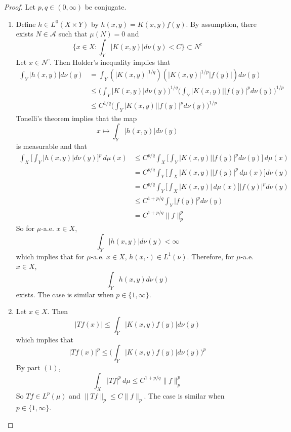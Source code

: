 \documentclass{book}
\theoremstyle{definition}
\newcommand{\MA}{\mathcal{A}}
\DeclareMathOperator*{\0}{\mbf{0}}
\DeclareMathOperator*{\1}{\mbf{1}}
\newcommand{\dmu}{\, d \mu}
\begin{document}
	\begin{proof}Let $p,q \in (0,\infty)$ be conjugate.
	\begin{enumerate}
	\item Define $h \in L^0(X \times Y)$ by $h(x,y) = K(x, y) f(y)$. By assumption, there exists $N \in \MA$ such that $\mu(N) = 0$ and  $$\bigg \{x \in X: \int_Y |K(x, y)| d \nu(y) < C \bigg\} \subset N^c$$ 
	Let $x \in N^c$. Then Holder's inequality implies that
	\begin{align*}
	\int_Y |h(x,y)| d\nu(y) 
	&= \int_Y (|K(x,y)|^{1/q})(|K(x,y)|^{1/p}|f(y)|) d\nu(y) \\
	& \leq \bigg( \int_Y |K(x,y)| d \nu(y) \bigg)^{1/q} \bigg( \int_Y |K(x,y)||f(y)|^p d\nu(y) \bigg)^{1/p} \\
	& \leq C^{1/q} \bigg( \int_Y |K(x,y)||f(y)|^p d\nu(y) \bigg)^{1/p}
	\end{align*}
	Tonelli's theorem implies that the map $$x \mapsto \int_Y |h(x,y)| d\nu(y) $$ is measurable and that  
	\begin{align*}
	\int_X \bigg[ \int_Y |h(x,y)| d\nu(y) \bigg]^p \dmu(x) 
	&\leq  C^{p/q}  \int_X \bigg[ \int_Y |K(x,y)||f(y)|^p d\nu(y) \bigg] \dmu(x) \\
	&= C^{p/q}  \int_Y \bigg[ \int_X |K(x,y)||f(y)|^p \dmu(x) \bigg] d\nu(y) \\
	&= C^{p/q}  \int_Y \bigg[ \int_X |K(x,y)| \dmu(x) \bigg] |f(y)|^p d\nu(y) \\
	& \leq C^{1 + p/q} \int_Y |f(y)|^p  d\nu(y) \\
	& = C^{1 + p/q} \|f\|_p^p
	\end{align*}
	So for $\mu$-a.e. $x \in X$, $$\int_Y |h(x,y)| d\nu(y) < \infty$$ which implies that for $\mu$-a.e. $x \in X$, $h(x, \cdot) \in L^1(\nu)$. Therefore, for $\mu$-a.e. $x \in X$, $$\int_Y h(x,y) d\nu(y)$$ exists. The case is similar when $p \in \{1, \infty\}$.
	\item Let $x \in X$. Then $$|Tf(x)| \leq \int_Y |K(x,y)f(y)| d \nu(y)$$ which implies that $$|Tf(x)|^p \leq \bigg( \int_Y |K(x,y)f(y)| d \nu(y) \bigg)^p$$
	By part $(1)$, $$\int_X |Tf|^p \dmu \leq C^{1+p/q}\|f\|_p^p$$ 
	So $Tf \in L^p(\mu)$ and $\|Tf\|_p \leq C\|f\|_p$.
	The case is similar when $p \in \{1, \infty\}$.
	\end{enumerate}
	\end{proof}
	
	
	
	
	
	
	

	
	
\end{document}
